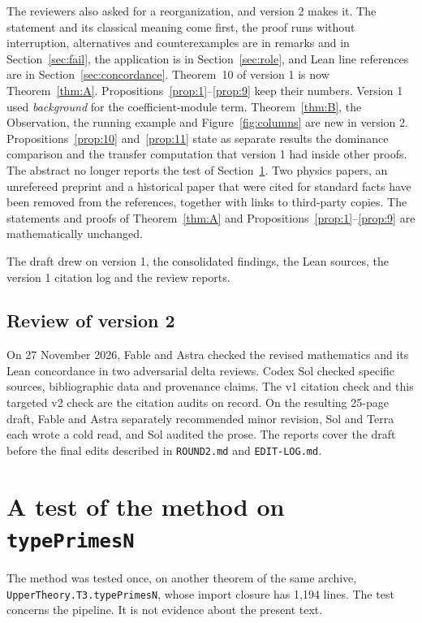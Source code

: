 \documentclass[11pt]{amsart}
\newcommand{\lean}[1]{\texttt{#1}}
\theoremstyle{definition}
\theoremstyle{remark}
\begin{document}
The reviewers also asked for a reorganization, and version 2 makes it. The
statement and its classical meaning come first, the proof runs without
interruption, alternatives and counterexamples are in remarks and in
Section~\ref{sec:fail}, the application is in Section~\ref{sec:role}, and
Lean line references are in Section~\ref{sec:concordance}. Theorem~10 of version 1 is now Theorem~\ref{thm:A}. Propositions~\ref{prop:1}--\ref{prop:9} keep their
numbers. Version 1 used \emph{background} for the coefficient-module term. Theorem~\ref{thm:B}, the Observation, the running example and
Figure~\ref{fig:columns} are new in version 2. Propositions~\ref{prop:10}
and~\ref{prop:11} state as separate results the dominance comparison and the
transfer computation that version 1 had inside other proofs. The
abstract no longer reports the test of Section~\ref{sec:validation}. Two
physics papers, an unrefereed preprint and a historical paper that were
cited for standard facts have been removed from the references, together
with links to third-party copies. The statements and proofs of
Theorem~\ref{thm:A} and Propositions~\ref{prop:1}--\ref{prop:9} are
mathematically unchanged.

The draft drew on version 1, the consolidated findings, the Lean sources,
the version 1 citation log and the review reports.

\subsection{Review of version 2}

On 27 November 2026, Fable and Astra checked the revised mathematics and
its Lean concordance in two adversarial delta reviews. Codex Sol checked
specific sources, bibliographic data and provenance claims. The v1 citation
check and this targeted v2 check are the citation audits on record. On the resulting 25-page draft,
Fable and Astra separately recommended minor revision, Sol and Terra
each wrote a cold read, and Sol audited the prose. The reports cover the
draft before the final edits described in \texttt{ROUND2.md} and
\texttt{EDIT-LOG.md}.

\section{A test of the method on \texorpdfstring{\texttt{typePrimesN}}{typePrimesN}}\label{sec:validation}

The method was tested once, on another theorem of the same archive,
\lean{UpperTheory.\allowbreak{}T3.\allowbreak{}typePrimesN}, whose import closure has 1,194 lines. The
test concerns the pipeline. It is not evidence about the present text.
\end{document}
